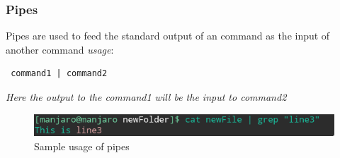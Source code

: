\documentclass{article}
\begin{document}
\subsubsection{Pipes}
Pipes are used to feed the standard output of an command as the input of another command\newline
\hspace{\parindent} {\em usage}: \begin{verbatim} command1 | command2 \end{verbatim}
\hspace{\parindent} {\em Here the output to the command1 will be the input to command2}
\begin{figure}[h]
    \centering
    \includegraphics[width=.80\textwidth]{img/p2/ss4.png}
    \caption{Sample usage of pipes}
\end{figure}
\end{document}
